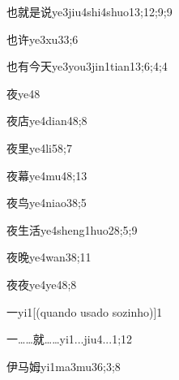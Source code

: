 \begin{verbete}{也就是说}{ye3jiu4shi4shuo1}{3;12;9;9}
\end{verbete}
\begin{verbete}{也许}{ye3xu3}{3;6}
\end{verbete}
\begin{verbete}{也有今天}{ye3you3jin1tian1}{3;6;4;4}
\end{verbete}
\begin{verbete}{夜}{ye4}{8}
\end{verbete}
\begin{verbete}{夜店}{ye4dian4}{8;8}
\end{verbete}
\begin{verbete}{夜里}{ye4li5}{8;7}
\end{verbete}
\begin{verbete}{夜幕}{ye4mu4}{8;13}
\end{verbete}
\begin{verbete}{夜鸟}{ye4niao3}{8;5}
\end{verbete}
\begin{verbete}{夜生活}{ye4sheng1huo2}{8;5;9}
\end{verbete}
\begin{verbete}{夜晚}{ye4wan3}{8;11}
\end{verbete}
\begin{verbete}{夜夜}{ye4ye4}{8;8}
\end{verbete}
\begin{verbete}{一}{yi1}[(quando usado sozinho)]{1}
\end{verbete}
\begin{verbete}{一……就……}{yi1...jiu4...}{1;12}
\end{verbete}
\begin{verbete}{伊马姆}{yi1ma3mu3}{6;3;8}
\end{verbete}
